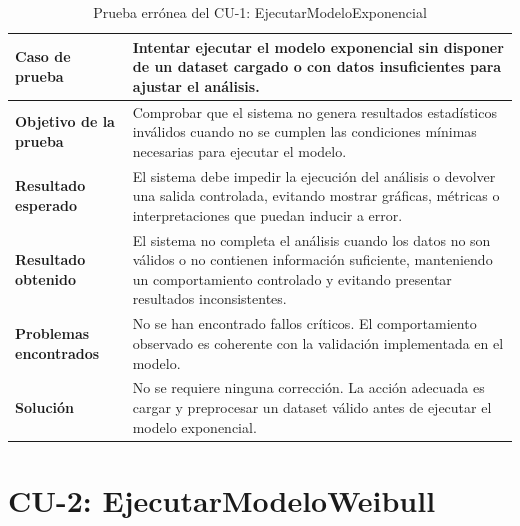 \begin{table}[H]
\centering
\small
\begin{tabularx}{\textwidth}{|p{}|X|}
\hline
\textbf{Caso de prueba} & Intentar ejecutar el modelo exponencial sin disponer de un dataset cargado o con datos insuficientes para ajustar el análisis. \\ \hline
\textbf{Objetivo de la prueba} & Comprobar que el sistema no genera resultados estadísticos inválidos cuando no se cumplen las condiciones mínimas necesarias para ejecutar el modelo. \\ \hline
\textbf{Resultado esperado} & El sistema debe impedir la ejecución del análisis o devolver una salida controlada, evitando mostrar gráficas, métricas o interpretaciones que puedan inducir a error. \\ \hline
\textbf{Resultado obtenido} & El sistema no completa el análisis cuando los datos no son válidos o no contienen información suficiente, manteniendo un comportamiento controlado y evitando presentar resultados inconsistentes. \\ \hline
\textbf{Problemas encontrados} & No se han encontrado fallos críticos. El comportamiento observado es coherente con la validación implementada en el modelo. \\ \hline
\textbf{Solución} & No se requiere ninguna corrección. La acción adecuada es cargar y preprocesar un dataset válido antes de ejecutar el modelo exponencial. \\ \hline
\end{tabularx}
\caption{Prueba errónea del CU-1: EjecutarModeloExponencial}
\label{tab:prueba_erronea_cu1}
\normalsize
\end{table}

\Needspace{0.80\textheight}
\section{CU-2: EjecutarModeloWeibull}


